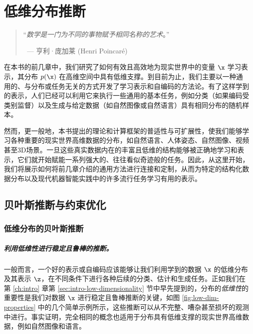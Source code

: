 \documentclass[../../book-main_zh.tex]{subfiles}
\begin{document}
\chapter{低维分布推断}
\label{ch:conditional-inference}

\begin{quote}

    \hfill    ``{\em 数学是一门为不同的事物赋予相同名称的艺术}。''

    $~$ \hfill --- 亨利·庞加莱 (Henri Poincar\'e)
\end{quote}
\vspace{5mm}

在本书的前几章中，我们研究了如何有效且高效地为现实世界中的变量 $\x$ 学习表示，其分布 $p(\x)$ 在高维空间中具有低维支撑。到目前为止，我们主要以一种通用的、与分布或任务无关的方式开发了学习表示和自编码的方法论。有了这样学到的表示，人们已经可以利用它来执行一些通用的基本任务，例如分类（如果编码受类别监督）以及生成与给定数据（如自然图像或自然语言）具有相同分布的随机样本。

然而，更一般地，本书提出的理论和计算框架的普适性与可扩展性，使我们能够学习各种重要的现实世界高维数据的分布，如自然语言、人体姿态、自然图像、视频甚至3D场景。一旦这些真实数据内在的丰富且低维的结构能够被正确地学习和表示，它们就开始赋能一系列强大的、往往看似奇迹般的任务。因此，从这里开始，我们将展示如何将前几章介绍的通用方法进行连接和定制，从而为特定的结构化数据分布以及现代机器智能实践中的许多流行任务学习有用的表示。

\section{贝叶斯推断与约束优化}

\subsection{低维分布的贝叶斯推断}
\paragraph{利用低维性进行稳定且鲁棒的推断。}
一般而言，一个好的表示或自编码应该能够让我们利用学到的数据 $\x$ 的低维分布及其表示 $\z$，在不同条件下进行各种后续的分类、估计和生成任务。正如我们在第 \ref{ch:intro} 章第 \ref{sec:intro-low-dimensionality} 节中早先提到的，分布的{\em 低维性}的重要性是我们对数据 $\x$ 进行稳定且鲁棒推断的关键，如图 \ref{fig:low-dim-properties} 中的几个简单示例所示，这些推断可以从不完整、嘈杂甚至损坏的观测中进行。事实证明，完全相同的概念也适用于分布具有低维支撑的现实世界高维数据，例如自然图像和语言。
\end{document}
